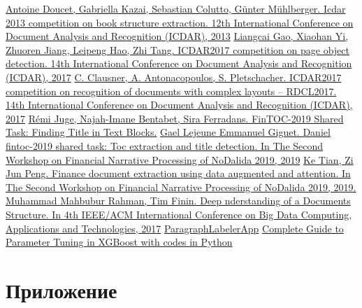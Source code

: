 \documentclass[a4paper,12pt]{article}
\begin{document}
 \begin{thebibliography}{}
     \href{https://hal.archives-ouvertes.fr/hal-01073396/document}{Antoine Doucet, Gabriella Kazai, Sebastian Colutto, Günter Mühlberger. Icdar 2013 competition on book structure extraction. 12th International Conference on Document Analysis and Recognition (ICDAR), 2013}
     \href{https://ieeexplore.ieee.org/abstract/document/8270162}{Liangcai Gao, Xiaohan Yi, Zhuoren Jiang, Leipeng Hao, Zhi Tang. ICDAR2017 competition on page object detection. 14th International Conference on Document Analysis and Recognition (ICDAR), 2017}
     \href{https://usir.salford.ac.uk/id/eprint/44369/1/ICDAR2017%20Competition%20on%20Recognition%20of%20Documents%20with%20Complex%20Layouts.pdf}{C. Clausner, A. Antonacopoulos, S. Pletschacher. ICDAR2017 competition on recognition of documents with complex layouts – RDCL2017. 14th International Conference on Document Analysis and Recognition (ICDAR), 2017}
     \href{https://www.aclweb.org/anthology/W19-6407.pdf}{Rémi Juge, Najah-Imane Bentabet, Sira Ferradans. FinTOC-2019 Shared Task: Finding Title in Text Blocks.}
     \href{https://www.aclweb.org/anthology/W19-6409.pdf}{Gael Lejeune Emmanuel Giguet. Daniel fintoc-2019 shared task: Toc extraction and title detection. In The Second Workshop on Financial Narrative Processing of NoDalida 2019, 2019}
     \href{http://www.ep.liu.se/ecp/165/001/ecp19165001.pdf}{Ke Tian, Zi Jun Peng. Finance document extraction using data augmented and attention. In The Second Workshop on Financial Narrative Processing of NoDalida 2019, 2019.}
     \href{https://dl.acm.org/doi/pdf/10.1145/3148055.3148080}{Muhammad Mahbubur Rahman, Tim Finin. Deep nderstanding of a Documents Structure. In 4th IEEE/ACM International Conference on Big Data Computing, Applications and Technologies, 2017}
     \href{https://github.com/dronperminov/ParagraphLabelerApp}{ParagraphLabelerApp}
     \href{https://www.analyticsvidhya.com/blog/2016/03/complete-guide-parameter-tuning-xgboost-with-codes-python/}{Complete Guide to Parameter Tuning in XGBoost with codes in Python}
\end{thebibliography}

\newpage
\section*{Приложение}
\end{document}
